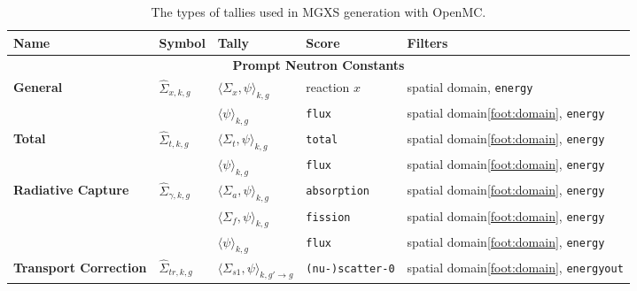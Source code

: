 \begin{table}[h!]
  \centering
  \caption[Tally types for MGXS generation]{The types of tallies used in MGXS generation with OpenMC.}
  \scriptsize
  \label{tab:tally-types}
  \vspace{6pt}
  \begin{tabular}{ m{1.5cm} m{1.2cm} m{2cm} m{2.5cm} l }
  \toprule
  {\bf Name} &
  {\bf Symbol} &
  {\bf Tally} &
  {\bf Score} &
  {\bf Filters} \\

  \midrule
  \multicolumn{5}{c}{\bf Prompt Neutron Constants} \\
  \midrule

  \multirow{2}{*}{\bf General} & \multirow{2}{*}{$\hat{\Sigma}_{x,k,g}$} & $\langle \Sigma_{x}, \psi \rangle_{k,g}$ & reaction $x$ & spatial domain\footnotemark, \texttt{energy} \\
  \cline{3-5}
  & & $\langle \psi \rangle_{k,g}$ & {\texttt{flux}} & spatial domain\ref{foot:domain}, \texttt{energy} \\

  \midrule

  \multirow{2}{*}{\bf Total} & \multirow{2}{*}{$\hat{\Sigma}_{t,k,g}$} & $\langle \Sigma_{t}, \psi \rangle_{k,g}$ & \texttt{total} & spatial domain\ref{foot:domain}, \texttt{energy} \\
  \cline{3-5}
  & & $\langle \psi \rangle_{k,g}$ & \texttt{flux} & spatial domain\ref{foot:domain}, \texttt{energy} \\

  \midrule

  \multirow{3}{*}{\parbox{1.5cm}{\bf Radiative Capture}} & \multirow{3}{*}{$\hat{\Sigma}_{\gamma,k,g}$} & $\langle \Sigma_{a}, \psi \rangle_{k,g}$ & \texttt{absorption} & spatial domain\ref{foot:domain}, \texttt{energy} \\
  \cline{3-5}
  & & $\langle \Sigma_{f}, \psi \rangle_{k,g}$ & \texttt{fission} & spatial domain\ref{foot:domain}, \texttt{energy} \\
  \cline{3-5}
  & & $\langle \psi \rangle_{k,g}$ & \texttt{flux} & spatial domain\ref{foot:domain}, \texttt{energy} \\

  \midrule

  \textbf{\parbox{1.5cm}{\bf Transport Correction}} & $\hat{\Sigma}_{tr,k,g}$ & $\langle \Sigma_{s1}, \psi \rangle_{k,g'\rightarrow g}$ & \texttt{(nu-)scatter-0} & spatial domain\ref{foot:domain}, \texttt{energyout} \\


\end{tabular}
\end{table}
